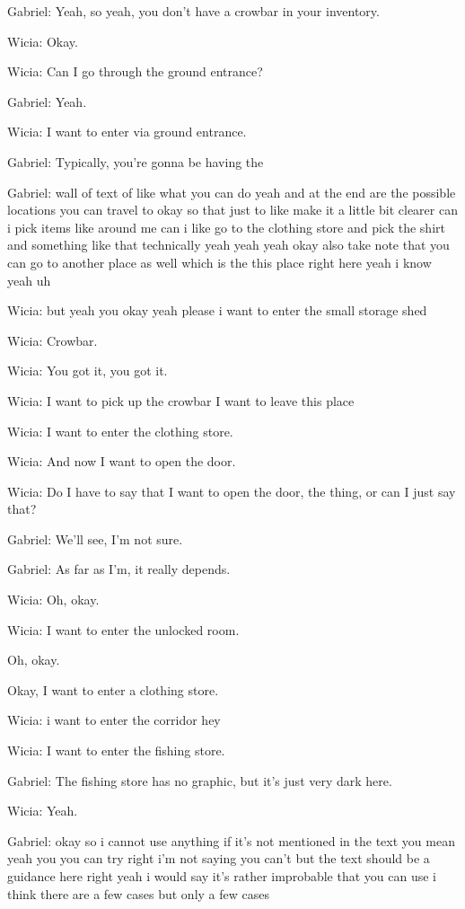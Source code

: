 Gabriel: Yeah, so yeah, you don't have a crowbar in your inventory.

Wicia: Okay.

Wicia: Can I go through the ground entrance?

Gabriel: Yeah.

Wicia: I want to enter via ground entrance.

Gabriel: Typically, you're gonna be having the

Gabriel: wall of text of like what you can do yeah and at the end are the possible locations you can travel to okay so that just to like make it a little bit clearer can i pick items like around me can i like go to the clothing store and pick the shirt and something like that technically yeah yeah yeah okay also take note that you can go to another place as well which is the this place right here yeah i know yeah uh

Wicia: but yeah you okay yeah please i want to enter the small storage shed

Wicia: Crowbar.

Wicia: You got it, you got it.

Wicia: I want to pick up the crowbar I want to leave this place

Wicia: I want to enter the clothing store.

Wicia: And now I want to open the door.

Wicia: Do I have to say that I want to open the door, the thing, or can I just say that?

Gabriel: We'll see, I'm not sure.

Gabriel: As far as I'm, it really depends.

Wicia: Oh, okay.

Wicia: I want to enter the unlocked room.

Oh, okay.

Okay, I want to enter a clothing store.

Wicia: i want to enter the corridor hey

Wicia: I want to enter the fishing store.

Gabriel: The fishing store has no graphic, but it's just very dark here.

Wicia: Yeah.

Gabriel: okay so i cannot use anything if it's not mentioned in the text you mean yeah you you can try right i'm not saying you can't but the text should be a guidance here right yeah i would say it's rather improbable that you can use i think there are a few cases but only a few cases

